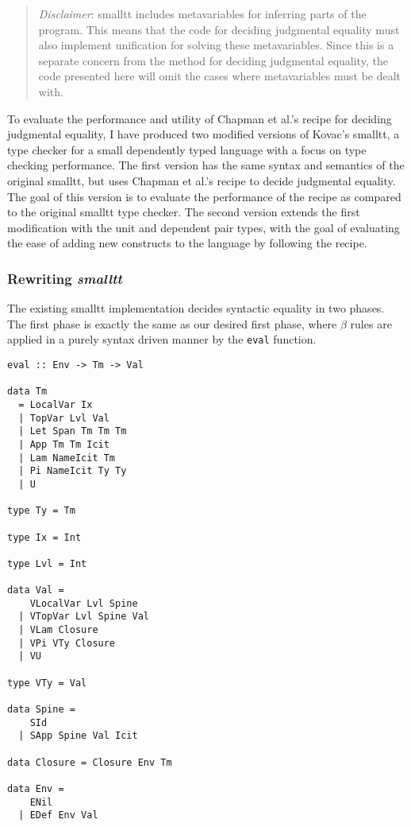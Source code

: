 \documentclass{article}
\begin{document}
\begin{quote}
\textit{Disclaimer}: smalltt includes metavariables for inferring parts of the program.
This means that the code for deciding judgmental equality must also implement unification for solving these metavariables.
Since this is a separate concern from the method for deciding judgmental equality, the code presented here will omit the cases where metavariables must be dealt with.
\end{quote}

To evaluate the performance and utility of Chapman et al.'s recipe for deciding judgmental equality, I have produced two modified versions of Kovac's smalltt, a type checker for a small dependently typed language with a focus on type checking performance.
The first version has the same syntax and semantics of the original smalltt, but uses Chapman et al.'s recipe to decide judgmental equality.
The goal of this version is to evaluate the performance of the recipe as compared to the original smalltt type checker.
The second version extends the first modification with the unit and dependent pair types, with the goal of evaluating the ease of adding new constructs to the language by following the recipe.

\subsubsection{Rewriting \textit{smalltt}}

The existing smalltt implementation decides syntactic equality in two phases.
The first phase is exactly the same as our desired first phase, where $\beta$ rules are applied in a purely syntax driven manner by the \lstinline{eval} function.

\begin{lstlisting}
eval :: Env -> Tm -> Val

data Tm
  = LocalVar Ix
  | TopVar Lvl Val
  | Let Span Tm Tm Tm
  | App Tm Tm Icit
  | Lam NameIcit Tm
  | Pi NameIcit Ty Ty
  | U

type Ty = Tm

type Ix = Int

type Lvl = Int

data Val =
    VLocalVar Lvl Spine
  | VTopVar Lvl Spine Val
  | VLam Closure
  | VPi VTy Closure
  | VU

type VTy = Val

data Spine =
    SId
  | SApp Spine Val Icit

data Closure = Closure Env Tm

data Env =
    ENil
  | EDef Env Val
\end{lstlisting}
\end{document}
